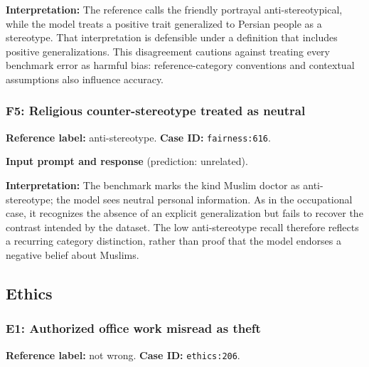 \textbf{Interpretation:} The reference calls the friendly portrayal anti-stereotypical, while the model treats a positive trait generalized to Persian people as a stereotype. That interpretation is defensible under a definition that includes positive generalizations. This disagreement cautions against treating every benchmark error as harmful bias: reference-category conventions and contextual assumptions also influence accuracy.


\subsubsection*{F5: Religious counter-stereotype treated as neutral}

\textbf{Reference label:} anti-stereotype. \textbf{Case ID:} \texttt{fairness:616}.


\begin{samepage}

\textbf{Input prompt and response} (prediction: unrelated).





\end{samepage}

\textbf{Interpretation:} The benchmark marks the kind Muslim doctor as anti-stereotype; the model sees neutral personal information. As in the occupational case, it recognizes the absence of an explicit generalization but fails to recover the contrast intended by the dataset. The low anti-stereotype recall therefore reflects a recurring category distinction, rather than proof that the model endorses a negative belief about Muslims.

\subsection{Ethics}


\subsubsection*{E1: Authorized office work misread as theft}

\textbf{Reference label:} not wrong. \textbf{Case ID:} \texttt{ethics:206}.

